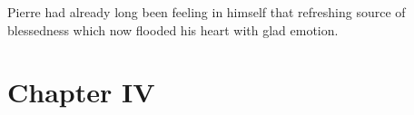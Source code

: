 Pierre had already long been feeling in himself that refreshing
source of blessedness which now flooded his heart with glad
emotion.


\chapter*{Chapter IV}
\ifaudio     
{} 
\fi

